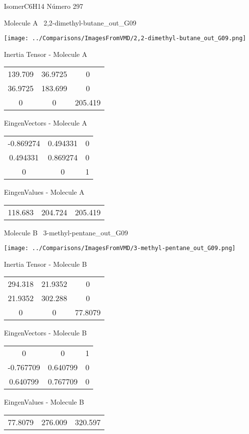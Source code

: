 \vtab[-3cm]
\begin{center}
{\large IsomerC6H14 \tab Número 297}
\end{center}
\begin{multicols}{2}
\begin{center}

Molecule A \
2,2-dimethyl-butane\_out\_G09

\texttt{[image: ../Comparisons/ImagesFromVMD/2,2-dimethyl-butane\_out\_G09.png]}

Inertia Tensor - Molecule A \\
\begin{tabular}{|c c c|}
139.709	 & 	36.9725	 & 	0	 \\
36.9725	 & 	183.699	 & 	0	 \\
0	 & 	0	 & 	205.419
\end{tabular}

\vtab
 EingenVectors - Molecule A     \\
\begin{tabular}{|c c c|}
-0.869274	 & 	0.494331	 & 	0	 \\
0.494331	 & 	0.869274	 & 	0	 \\
0	 & 	0	 & 	1
\end{tabular}

\vtab
 EingenValues - Molecule A     \\
\begin{tabular}{|c c c|}
118.683	 & 	204.724	 & 	205.419	 \\
\end{tabular}
\columnbreak

Molecule B \
3-methyl-pentane\_out\_G09

\texttt{[image: ../Comparisons/ImagesFromVMD/3-methyl-pentane\_out\_G09.png]}

Inertia Tensor - Molecule B \\
\begin{tabular}{|c c c|}
294.318	 & 	21.9352	 & 	0	 \\
21.9352	 & 	302.288	 & 	0	 \\
0	 & 	0	 & 	77.8079
\end{tabular}

\vtab
 EingenVectors - Molecule B     \\
\begin{tabular}{|c c c|}
0	 & 	0	 & 	1	 \\
-0.767709	 & 	0.640799	 & 	0	 \\
0.640799	 & 	0.767709	 & 	0
\end{tabular}

\vtab
 EingenValues - Molecule B     \\
\begin{tabular}{|c c c|}
77.8079	 & 	276.009	 & 	320.597	 \\
\end{tabular}

\end{center}
\end{multicols}


